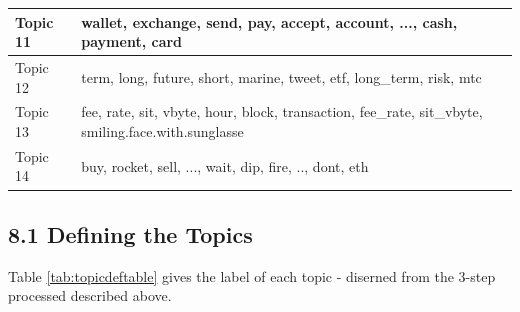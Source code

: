 \documentclass[
]{article}
\begin{document}
\begin{table}
\begin{tabular}[t]{l|l}
\hline
Topic 11 & wallet,   exchange,       send,        pay,     accept,    account,        ...,       cash,    payment,       card\\
\hline
Topic 12 & term,        long,      future,       short,      marine,       tweet,         etf,   long\_term,        risk,         mtc\\
\hline
Topic 13 & fee,                              rate,                               sit,                             vbyte,                              hour,                             block,                       transaction,                          fee\_rate,                         sit\_vbyte,       smiling.face.with.sunglasse\\
\hline
Topic 14 & buy,       rocket,         sell,          ...,         wait,          dip,         fire,           ..,         dont,          eth\\
\hline
\end{tabular}
\end{table}

\hypertarget{defining-the-topics}{%
\subsection{8.1 Defining the Topics}\label{defining-the-topics}}

Table \ref{tab:topicdeftable} gives the label of each topic - diserned
from the 3-step processed described above.
\end{document}
